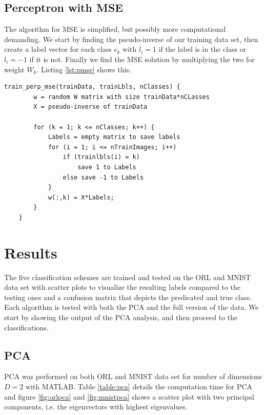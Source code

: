 \documentclass[journal]{IEEEtran}
\begin{document}
\subsection{Perceptron with MSE} 

The algorithm for MSE is simplified, but possibly more computational demanding. We start by finding the pseudo-inverse of our training data set, then create a label vector for each class $c_{k}$ with $l_{i} = 1$ if the label is in the class or $l_{i} = -1$ if it is not. Finally we find the MSE solution by multiplying the two for weight $W_{k}$. Listing \ref{lst:pmse} shows this.

\begin{minipage}[H]{0.95\linewidth}
	\begin{lstlisting}[caption=Implementation of NSC., label={lst:pmse}]
	train_perp_mse(trainData, trainLbls, nClasses) {
		w = random W matrix with size trainData*nCLasses
		X = pseudo-inverse of trainData
		
		for (k = 1; k <= nClasses; k++) {
			Labels = empty matrix to save labels
			for (i = 1; i <= nTrainImages; i++)
				if (trainlbls(i) = k)
					save 1 to Labels
				else save -1 to Labels
			}
			w(:,k) = X*Labels;
		}
	}
	\end{lstlisting}
\end{minipage}

\section{Results}

The five classification schemes are trained and tested on the ORL and MNIST data set with scatter plots to visualize the resulting labels compared to the testing ones and a confusion matrix that depicts the predicated and true class. Each algorithm is tested with both the PCA and the full version of the data. We start by showing the output of the PCA analysis, and then proceed to the classifications.

\subsection{PCA}

PCA was performed on both ORL and MNIST data set for number of dimensions $D=2$ with MATLAB. Table \ref{table:pca} details the computation time for PCA and figure \ref{fig:orlpca} and \ref{fig:mnistpca} shows a scatter plot with two principal components, i.e. the eigenvectors with highest eigenvalues.
\end{document}
